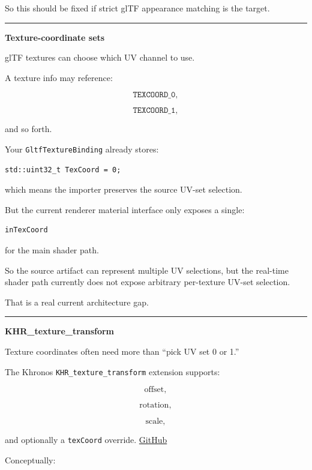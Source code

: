 So this should be fixed if strict glTF appearance matching is the target.

\begin{center}\rule{0.5\linewidth}{0.5pt}\end{center}

\textbf{Texture-coordinate sets}

glTF textures can choose which UV channel to use.

A texture info may reference:

\[
\texttt{TEXCOORD_0},
\]

\[
\texttt{TEXCOORD_1},
\]

and so forth.

Your \texttt{GltfTextureBinding} already stores:

\begin{verbatim}
std::uint32_t TexCoord = 0;
\end{verbatim}

which means the importer preserves the source UV-set selection.

But the current renderer material interface only exposes a single:

\begin{verbatim}
inTexCoord
\end{verbatim}

for the main shader path.

So the source artifact can represent multiple UV selections, but the real-time shader path currently does not expose arbitrary per-texture UV-set selection.

That is a real current architecture gap.

\begin{center}\rule{0.5\linewidth}{0.5pt}\end{center}

\textbf{KHR\_texture\_transform}

Texture coordinates often need more than ``pick UV set 0 or 1.''

The Khronos \texttt{KHR\_texture\_transform} extension supports:

\[
\text{offset},
\]

\[
\text{rotation},
\]

\[
\text{scale},
\]

and optionally a \texttt{texCoord} override. \href{https://github.com/KhronosGroup/glTF/blob/main/extensions/2.0/Khronos/KHR_texture_transform/README.md?utm_source=chatgpt.com}{GitHub}

Conceptually:

